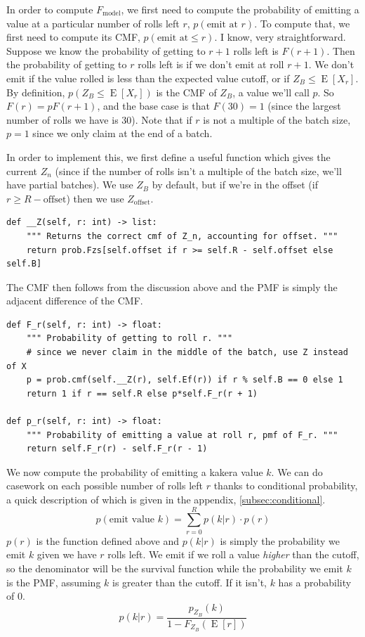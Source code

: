 \documentclass[11pt, oneside]{article}
\DeclareMathOperator{\E}{E}
\theoremstyle{plain}
\theoremstyle{definition}
\begin{document}
In order to compute \( F_\text{model} \), we first need to compute the
probability of emitting a value at a particular number of rolls left \( r \),
\( p(\text{emit at } r) \). To compute that, we first need to compute its
CMF, \( p(\text{emit at} \leq r) \). I know, very straightforward. Suppose we
know the probability of getting to \( r + 1 \) rolls left is \( F(r + 1) \).
Then the probability of getting to \( r \) rolls left is if we don't emit at
roll \( r + 1 \). We don't emit if the value rolled is less than the expected
value cutoff, or if \( Z_B \leq \E[X_{r}] \). By definition, \( p(Z_{B} \leq
\E[X_{r}]) \) is the CMF of \( Z_B \), a value we'll call \( p \). So \( F(r)
= p F(r + 1) \), and the base case is that \( F(30) = 1 \) (since the largest
number of rolls we have is 30). Note that if \( r \) is not a multiple of the
batch size, \( p = 1 \) since we only claim at the end of a batch.

In order to implement this, we first define a useful function which gives
the current \( Z_n \) (since if the number of rolls isn't a multiple of the
batch size, we'll have partial batches). We use \( Z_B \) by default, but
if we're in the offset (if \( r \geq R - \text{offset} \)) then we use \(
Z_{\text{offset}} \).
\begin{verbatim}
def __Z(self, r: int) -> list:
    """ Returns the correct cmf of Z_n, accounting for offset. """
    return prob.Fzs[self.offset if r >= self.R - self.offset else self.B]
\end{verbatim}

The CMF then follows from the discussion above and
the PMF is simply the adjacent difference of the CMF.
\begin{verbatim}
def F_r(self, r: int) -> float:
    """ Probability of getting to roll r. """
    # since we never claim in the middle of the batch, use Z instead of X  
    p = prob.cmf(self.__Z(r), self.Ef(r)) if r % self.B == 0 else 1
    return 1 if r == self.R else p*self.F_r(r + 1)

def p_r(self, r: int) -> float:
    """ Probability of emitting a value at roll r, pmf of F_r. """
    return self.F_r(r) - self.F_r(r - 1)
\end{verbatim}

We now compute the probability of emitting a kakera value \( k \). We
can do casework on each possible number of rolls left \( r \) thanks
to conditional probability, a quick description of which is given in
the appendix, \autoref{subsec:conditional}.
\[ p(\text{emit value } k) = \sum^R_{r = 0} p(k|r) \cdot p(r) \]
\( p(r) \) is the function defined above and \( p(k|r) \) is simply the
probability we emit \( k \) given we have \( r \) rolls left. We emit if we
roll a value \textit{higher} than the cutoff, so the denominator will be the
survival function while the probability we emit \( k \) is the PMF, assuming \(
k \) is greater than the cutoff. If it isn't, \( k \) has a probability of 0.
\[ p(k|r) = \frac{p_{Z_B}(k)}{1 - F_{Z_B}(\E[r])} \]
\end{document}
